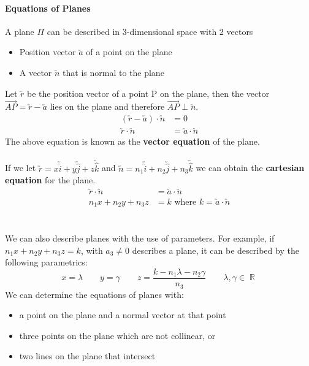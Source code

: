 \documentclass[a4paper,twoside]{article}
\DeclareMathOperator\R{\mathbb{R}}
\begin{document}
			\paragraph{Equations of Planes} A plane $\Pi$ can be described in 3-dimensional space with 2 vectors
			\begin{itemize}
				\item Position vector $\utilde{a}$ of a point on the plane
				\item A vector $\utilde{n}$ that is normal to the plane
			\end{itemize}
			Let $\utilde{r}$ be the position vector of a point P on the plane, then the vector $\overrightarrow{AP}=\utilde{r}-\utilde{a}$ lies on the plane and therefore $\overrightarrow{AP}\perp\utilde{n}$.\\
			\begin{align*}
				(\utilde{r}-\utilde{a})\cdot\utilde{n}&=0 \\
				\utilde{r}\cdot\utilde{n}&=\utilde{a}\cdot\utilde{n}
			\end{align*}
			The above equation is known as the \textbf{vector equation} of the plane.\\\\
			If we let $\utilde{r}=x\utilde{\hat{i}}+y\utilde{\hat{j}}+z\utilde{\hat{k}}$ and $\utilde{n}=n_1\utilde{\hat{i}}+n_2\utilde{\hat{j}}+n_3\utilde{\hat{k}}$ we can obtain the \textbf{cartesian equation} for the plane.\\
			\begin{align*}
				\utilde{r}\cdot\utilde{n}&=\utilde{a}\cdot\utilde{n} \\
				n_1x+n_2y+n_3z&=k\text{ where }k=\utilde{a}\cdot\utilde{n}
			\end{align*}
			\\\\
			We can also describe planes with the use of parameters. For example, if $n_1x+n_2y+n_3z=k$, with $a_3\neq0$ describes a plane, it can be described by the following parametrics:
			\begin{equation*}
				x=\lambda \qquad y=\gamma \qquad z=\frac{k-n_1\lambda-n_2\gamma}{n_3} \qquad \lambda,\gamma\in\R
			\end{equation*}
			We can determine the equations of planes with:
			\begin{itemize}
				\item a point on the plane and a normal vector at that point
				\item three points on the plane which are not collinear, or
				\item two lines on the plane that intersect
			\end{itemize}
		
\end{document}
